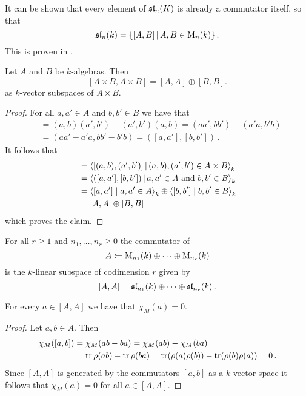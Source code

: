 \begin{remark}
  It can be shown that every element of $\operatorname{\mathfrak{sl}}_n(K)$ is already a commutator itself, so that
  \[
      \sllie_n(k)
    = \{ [A,B] \suchthat A, B \in \Mat_n(k) \} \,.
  \]
  This is proven in \cite{TraceZero}.
\end{remark}


\begin{lemma}
  Let $A$ and $B$ be $k$-algebras.
  Then
  \[
      [A \times B, A \times B]
    = [A,A] \oplus [B,B].
  \]
  as $k$-vector subspaces of $A \times B$.
\end{lemma}
\begin{proof}
  For all $a, a' \in A$ and $b, b' \in B$ we have that
  \begin{align*}
        [(a,b),(a',b')]
    &=  (a,b)(a',b') - (a',b')(a,b)
     =  (aa',bb') - (a'a, b'b) \\
    &=  (aa'-a'a, bb' - b'b)
     =  ([a,a'], [b,b']) \,.
  \end{align*}
  It follows that
  \begin{align*}
        [A \times B, A \times B]
    &=  \gen{
          [(a,b), (a',b')]
        \suchthat
          (a,b), (a',b') \in A \times B
        }_k \\
    &= \gen{
          ([a,a'], [b,b'])
        \suchthat
          a, a' \in A
          \text{ and }
          b, b' \in B
        }_k \\
    &=  \gen{ [a,a'] \mid a, a' \in A }_k
        \oplus
        \gen{ [b,b'] \mid b, b' \in B }_k \\
    &= [A,A] \oplus [B,B]
  \end{align*}
  which proves the claim.
\end{proof}


\begin{corollary}
  \label{corollary: commutator product of matrix algebras}
  For all $r \geq 1$ and $n_1, \dots, n_r \geq 0$ the commutator of
  \[
              A
     \coloneqq \operatorname{M}_{n_1}(k) \oplus \dotsb \oplus \operatorname{M}_{n_r}(k)
  \]
  is the $k$-linear subspace of codimension $r$ given by
  \[
        [A,A]
     =  \operatorname{\mathfrak{sl}}_{n_1}(k) \oplus \dotsb \oplus \operatorname{\mathfrak{sl}}_{n_r}(k) \,.
  \]
\end{corollary}


\begin{lemma}
  \label{lemma: characters are zero on commutators}
  For every $a \in [A,A]$ we have that $\chi_M(a) = 0$.
\end{lemma}


\begin{proof}
  Let $a, b \in A$.
  Then
  \begin{align*}
        \chi_M([a,b])
    &=  \chi_M(ab - ba)
     =  \chi_M(ab) - \chi_M(ba) \\
    &=  \operatorname{tr} \rho(ab) - \operatorname{tr} \rho(ba)
     =  \operatorname{tr}( \rho(a) \rho(b) ) - \operatorname{tr}( \rho(b) \rho(a) )
     =  0 \,.
  \end{align*}
  Since $[A,A]$ is generated by the commutators $[a,b]$ as a $k$-vector space it follows that $\chi_M(a) = 0$ for all $a \in [A,A]$.
\end{proof}


